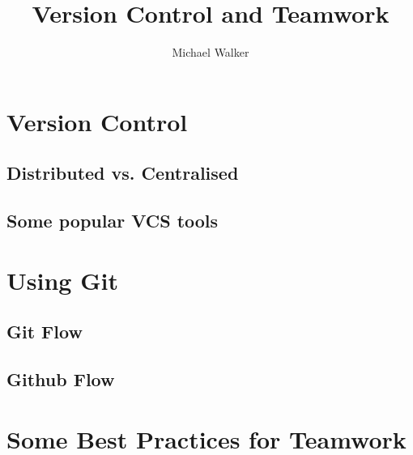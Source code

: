 \documentclass[12pt,a4paper]{article}
\author{Michael Walker}
\title{Version Control and Teamwork}
\begin{document}
\maketitle
\tableofcontents
\pagebreak

\section{Version Control}

\subsection{Distributed vs. Centralised}

\subsection{Some popular VCS tools}

\section{Using Git}

\subsection{Git Flow}

\subsection{Github Flow}

\section{Some Best Practices for Teamwork}
\end{document}
